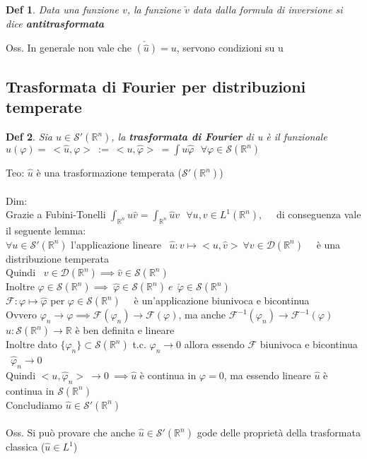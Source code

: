 \documentclass{article}
\theoremstyle{unnumbered}
\newtheorem* {theoremT}{Def}
\theoremstyle{unnumbered1}
\newenvironment{defi}{\begin{gBox}\begin{theoremT}}{\end{theoremT}\end{gBox}}
\renewcommand{\phi}{\varphi}
\renewcommand{\hat}{\widehat}
\begin{document}
\begin{defi}
Data una funzione $v$, la funzione $\check{v}$ data dalla formula di inversione si dice \textbf{antitrasformata}
\end{defi}
%
Oss. In generale non vale che $\check{(\widehat{u})}=u$, servono condizioni su u %



\subsection{Trasformata di Fourier per distribuzioni temperate}
%
%
\begin{defi}
Sia $u\in\mathcal{S}'(\mathbb{R}^n)$, la \textbf{trasformata di Fourier} di u è il funzionale\\ 
$\hat{u}(\phi)= \ <\hat{u},\phi> \ := \ <u,\hat{\phi}> \ =\int u\hat{\phi} \ \ \ \forall \phi\in\mathcal{S}(\mathbb{R}^n)$
\end{defi}
%
Teo: $\hat{u}$ è una trasformazione temperata ($\mathcal{S}'(\mathbb{R}^n)$)
\\ \\
Dim:\\
Grazie a Fubini-Tonelli $\int_{\mathbb{R}^n}u\hat{v}=\int_{\mathbb{R}^n}\hat{u}v \ \ \ \forall u,v \in L^1(\mathbb{R}^n),$ \ \ di conseguenza vale il seguente lemma:\\
%
$\forall u\in\mathcal{S}'(\mathbb{R}^n)$ l'applicazione lineare \ $\hat{u}: v \mapsto <u,\hat{v}> \ \forall v\in\mathcal{D}(\mathbb{R}^n)$ \ \ è una distribuzione temperata\\
Quindi \ $v\in\mathcal{D}(\mathbb{R}^n)\implies\hat{v}\in\mathcal{S}(\mathbb{R}^n)$\\
%
%
Inoltre $\phi\in\mathcal{S}(\mathbb{R}^n)\implies \  \hat{\phi}\in\mathcal{S}(\mathbb{
R}^n) \ e \ \ \check{\phi}\in\mathcal{S}(\mathbb{
R}^n)$\\
$\mathcal{F}: \phi\mapsto\hat{\phi}$ per $\phi\in\mathcal{S}(\mathbb{R}^n)$ \ \ è un'applicazione biunivoca e bicontinua \\
Ovvero $\phi_n\to\phi\implies \mathcal{F}(\phi_n)\to\mathcal{F}(\phi)$, ma anche $\mathcal{F}^{-1}(\phi_n)\to\mathcal{F}^{-1}(\phi)$\\
%
$\hat{u}:\mathcal{S}(\mathbb{R}^n)\to\mathbb{R}$ è ben definita e lineare\\
Inoltre dato $\{\phi_n\}\subset\mathcal{S}(\mathbb{R}^n)$ t.c. $\phi_n\to 0$ allora essendo $\mathcal{F}$ biunivoca e bicontinua \ $\hat{\phi}_n\to 0 $ \\
Quindi $<u,\hat{\phi}_n> \ \to 0 \ \implies \hat{u}$ è continua in $\phi=0$, ma essendo lineare $\hat{u}$ è continua in $\mathcal{S}(\mathbb{R}^n)$\\
Concludiamo $\hat{u}\in\mathcal{S}'(\mathbb{R}^n)$ \\ \\
%
%
%
Oss. Si può provare che anche $\hat{u}\in\mathcal{S}'(\mathbb{R}^n)$ gode delle proprietà della trasformata classica ($\hat{u}\in L^1$)\\
\end{document}
